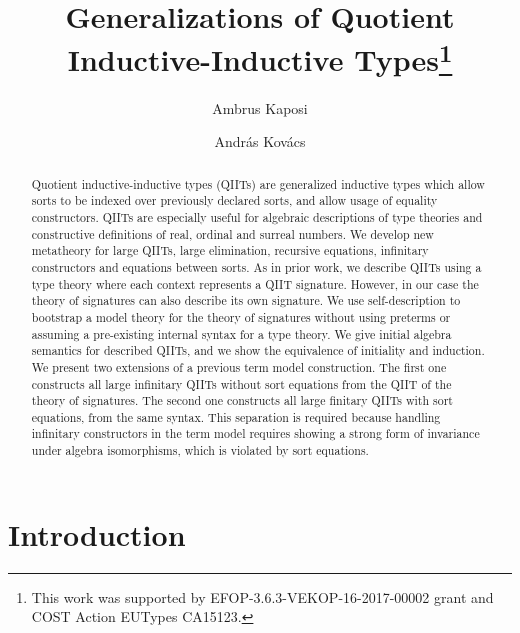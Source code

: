 \documentclass{llncs}
\begin{document}
\title{Generalizations of Quotient Inductive-Inductive Types\thanks{This work
    was supported by EFOP-3.6.3-VEKOP-16-2017-00002 grant and COST
    Action EUTypes CA15123.}}

\author{Ambrus Kaposi \and Andr{\'a}s Kov{\'a}cs}

\maketitle

\begin{abstract}
Quotient inductive-inductive types (QIITs) are generalized inductive types which
allow sorts to be indexed over previously declared sorts, and allow usage of
equality constructors. QIITs are especially useful for algebraic descriptions of
type theories and constructive definitions of real, ordinal and surreal
numbers. We develop new metatheory for large QIITs, large elimination, recursive
equations, infinitary constructors and equations between sorts.
As in prior work, we describe QIITs using a type theory where each context
represents a QIIT signature. However, in our case the theory of signatures can
also describe its own signature. We use self-description to bootstrap a model
theory for the theory of signatures without using preterms or assuming a
pre-existing internal syntax for a type theory. We give initial algebra
semantics for described QIITs, and we show the equivalence of initiality and
induction. We present two extensions of a previous term model construction. The
first one constructs all large infinitary QIITs without sort equations from the
QIIT of the theory of signatures. The second one constructs all large finitary
QIITs with sort equations, from the same syntax. This separation is required
because handling infinitary constructors in the term model requires showing a
strong form of invariance under algebra isomorphisms, which is violated by sort
equations.

\end{abstract}

\section{Introduction}
\label{sec:intro}
\end{document}

